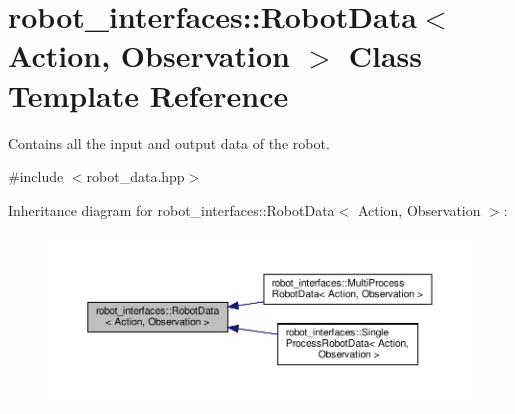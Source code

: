 \hypertarget{classrobot__interfaces_1_1RobotData}{}\section{robot\+\_\+interfaces\+:\+:Robot\+Data$<$ Action, Observation $>$ Class Template Reference}
\label{classrobot__interfaces_1_1RobotData}


Contains all the input and output data of the robot.  




{\ttfamily \#include $<$robot\+\_\+data.\+hpp$>$}



Inheritance diagram for robot\+\_\+interfaces\+:\+:Robot\+Data$<$ Action, Observation $>$\+:
\nopagebreak
\begin{figure}[H]
\begin{center}
\leavevmode
\includegraphics[width=350pt]{classrobot__interfaces_1_1RobotData__inherit__graph}
\end{center}
\end{figure}
